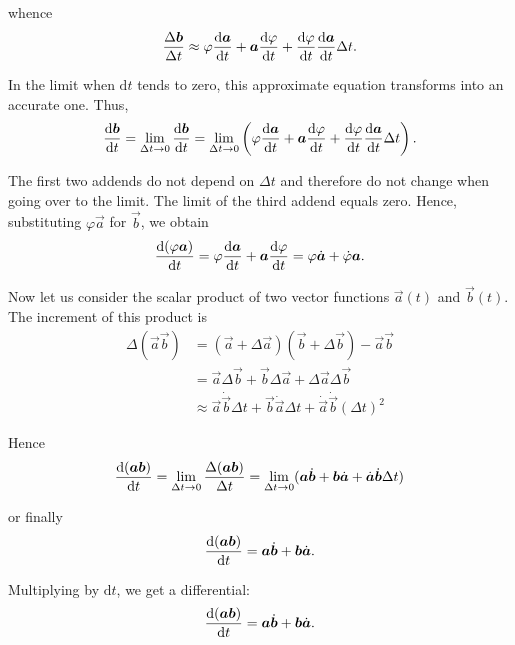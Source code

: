 \noindent
whence
\begin{equation*}
\frac{\Delta\boldsymbol{b}}{\Delta t} \approx \varphi\frac{\mathrm{d}\boldsymbol{a}}{\mathrm{d} t} + \boldsymbol{a}\frac{\mathrm{d}\varphi}{\mathrm{d} t} + \frac{\mathrm{d}\varphi}{\mathrm{d} t}\frac{\mathrm{d}\boldsymbol{a}}{\mathrm{d} t}\Delta t.
\end{equation*}

\noindent
In the limit when $\mathrm{d}t$ tends to zero, this approximate equation transforms into an accurate one. Thus,
\begin{equation*}
\frac{\mathrm{d}\boldsymbol{b}}{\mathrm{d} t} = \lim_{\Delta t\to 0} \frac{\mathrm{d}\boldsymbol{b}}{\mathrm{d} t} =  \lim_{\Delta t\to 0} \left(\varphi\frac{\mathrm{d}\boldsymbol{a}}{\mathrm{d} t} + \boldsymbol{a}\frac{\mathrm{d}\varphi}{\mathrm{d} t} + \frac{\mathrm{d}\varphi}{\mathrm{d} t} \frac{\mathrm{d}\boldsymbol{a}}{\mathrm{d} t}\Delta t\right).
\end{equation*}

\noindent
The first two addends do not depend on $\Delta t$ and therefore do not change when going over to the limit. The limit of the third addend equals zero. Hence, substituting $\varphi\vec{a}$ for $\vec{b}$, we obtain
\begin{equation}\label{eq:1_49}
\frac{\mathrm{d}(\varphi\boldsymbol{a})}{\mathrm{d} t} = \varphi\frac{\mathrm{d}\boldsymbol{a}}{\mathrm{d} t} + \boldsymbol{a}\frac{\mathrm{d}\varphi}{\mathrm{d} t} = \varphi\dot{\boldsymbol{a}}+\dot{\varphi}\boldsymbol{a}.
\end{equation}

Now let us consider the scalar product of two vector functions $\vec{a}(t)$ and $\vec{b}(t)$. The increment of this product is
\begin{align*}
\Delta(\vec{a}\vec{b}) &= (\vec{a} + \Delta\vec{a})(\vec{b} + \Delta\vec{b}) - \vec{a}\vec{b}\\
&= \vec{a}\Delta\vec{b} + \vec{b}\Delta\vec{a} + \Delta\vec{a}\Delta\vec{b} \\
&\approx \vec{a}\dot{\vec{b}}\Delta t + \vec{b}\dot{\vec{a}}\Delta t + \dot{\vec{a}}\dot{\vec{b}}(\Delta t)^2
\end{align*}

\noindent
Hence
\begin{equation*}
\frac{\mathrm{d}(\boldsymbol{a}\boldsymbol{b})}{\mathrm{d} t} = \lim_{\Delta t\to 0} \frac{\Delta(\boldsymbol{a}\boldsymbol{b})}{\Delta t} = \lim_{\Delta t\to 0} (\boldsymbol{a}\dot{\boldsymbol{b}} + \boldsymbol{b}\dot{\boldsymbol{a}} + \dot{\boldsymbol{a}}\dot{\boldsymbol{b}}\Delta t)
\end{equation*}

\noindent
or finally
\begin{equation}\label{eq:1_50}
\frac{\mathrm{d}(\boldsymbol{a}\boldsymbol{b})}{\mathrm{d} t} = \boldsymbol{a}\dot{\boldsymbol{b}} + \boldsymbol{b}\dot{\boldsymbol{a}}.
\end{equation}

\noindent
Multiplying  by $\mathrm{d}t$, we get a differential:
\begin{equation}\label{eq:1_51}
\frac{\mathrm{d}(\boldsymbol{a}\boldsymbol{b})}{\mathrm{d} t} = \boldsymbol{a}\dot{\boldsymbol{b}} + \boldsymbol{b}\dot{\boldsymbol{a}}.
\end{equation}

